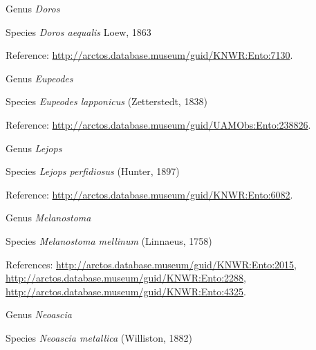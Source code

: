 \documentclass[9pt, article]{memoir}
\begin{document}
\begin{multicols}{2}
\vspace{6pt}\noindent\hspace{30pt}Genus \textit{Doros}


\vspace{6pt}\noindent\hspace{36pt}Species \textit{Doros aequalis} Loew, 1863


\vspace{6pt}Reference: 
\url{http://arctos.database.museum/guid/KNWR:Ento:7130}.

\vspace{6pt}\noindent\hspace{30pt}Genus \textit{Eupeodes}


\vspace{6pt}\noindent\hspace{36pt}Species \textit{Eupeodes lapponicus} (Zetterstedt, 1838)


\vspace{6pt}Reference: 
\url{http://arctos.database.museum/guid/UAMObs:Ento:238826}.

\vspace{6pt}\noindent\hspace{30pt}Genus \textit{Lejops}


\vspace{6pt}\noindent\hspace{36pt}Species \textit{Lejops perfidiosus} (Hunter, 1897)


\vspace{6pt}Reference: 
\url{http://arctos.database.museum/guid/KNWR:Ento:6082}.

\vspace{6pt}\noindent\hspace{30pt}Genus \textit{Melanostoma}


\vspace{6pt}\noindent\hspace{36pt}Species \textit{Melanostoma mellinum} (Linnaeus, 1758)


\vspace{6pt}References: 
\url{http://arctos.database.museum/guid/KNWR:Ento:2015}, 
\url{http://arctos.database.museum/guid/KNWR:Ento:2288}, 
\url{http://arctos.database.museum/guid/KNWR:Ento:4325}.

\vspace{6pt}\noindent\hspace{30pt}Genus \textit{Neoascia}


\vspace{6pt}\noindent\hspace{36pt}Species \textit{Neoascia metallica} (Williston, 1882)



\end{multicols}
\end{document}

